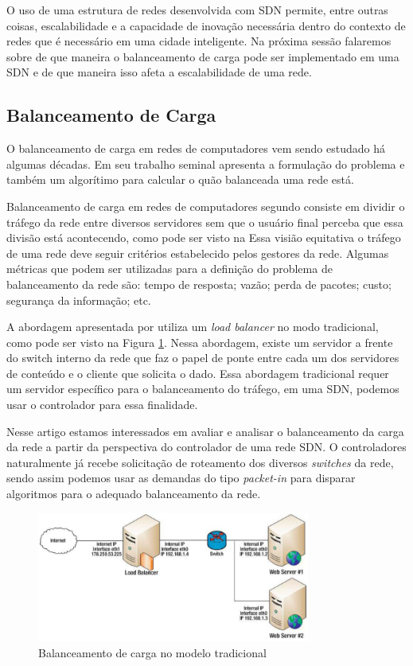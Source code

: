\documentclass[12pt]{article}
\begin{document}
O uso de uma estrutura de redes desenvolvida com SDN permite, entre outras coisas, escalabilidade e a capacidade de inovação necessária dentro do contexto de redes que é necessário em uma cidade inteligente. Na próxima sessão falaremos sobre de que maneira o balanceamento de carga pode ser implementado em uma SDN e de que maneira isso afeta a escalabilidade de uma rede.

\subsection{Balanceamento de Carga}

O balanceamento de carga em redes de computadores vem sendo estudado há algumas décadas. Em seu trabalho seminal \cite{Stentz1988} apresenta a formulação do problema e também um algorítimo para calcular o quão balanceada uma rede está.

Balanceamento de carga em redes de computadores segundo \cite{Peter2012} consiste em dividir o tráfego da rede entre diversos servidores sem que o usuário final perceba que essa divisão está acontecendo, como pode ser visto na  Essa visião equitativa o tráfego de uma rede deve seguir critérios estabelecido pelos gestores da rede. Algumas métricas que podem ser utilizadas para a definição do problema de balanceamento da rede são: tempo de resposta; vazão; perda de pacotes; custo; segurança da informação; etc.

A abordagem apresentada por \cite{Peter2012} utiliza um \textit{load balancer} no modo tradicional, como pode ser visto na Figura \ref{fig:balanceamento_carga_tradicional}. Nessa abordagem, existe um servidor a frente do switch interno da rede que faz o papel de ponte entre cada um dos servidores de conteúdo e o cliente que solicita o dado. Essa abordagem tradicional requer um servidor específico para o balanceamento do tráfego, em uma SDN, podemos usar o controlador para essa finalidade.

Nesse artigo estamos interessados em avaliar e analisar o balanceamento da carga da rede a partir da perspectiva do controlador de uma rede SDN. O controladores naturalmente já recebe solicitação de roteamento dos diversos \textit{switches} da rede, sendo assim podemos usar as demandas do tipo \textit{packet-in} para disparar algoritmos para o adequado balanceamento da rede.

\begin{figure}[ht]
\centering
\includegraphics[width=0.8\textwidth]{images/load_balance.png}
\caption{Balanceamento de carga no modelo tradicional \cite{Peter2012}}
\label{fig:balanceamento_carga_tradicional}
\end{figure}
\end{document}
